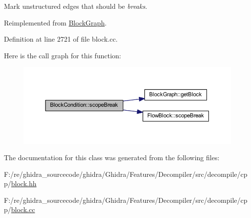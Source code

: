Mark unstructured edges that should be {\itshape breaks}. 



Reimplemented from \mbox{\hyperlink{class_block_graph_a55618dfd49266bd4185d119f08e8b630}{Block\+Graph}}.



Definition at line 2721 of file block.\+cc.

Here is the call graph for this function\+:
\nopagebreak
\begin{figure}[H]
\begin{center}
\leavevmode
\includegraphics[width=350pt]{class_block_condition_ab25a80cf066d355146cd5b4a67d91f46_cgraph}
\end{center}
\end{figure}


The documentation for this class was generated from the following files\+:\begin{DoxyCompactItemize}
\item 
F\+:/re/ghidra\+\_\+sourcecode/ghidra/\+Ghidra/\+Features/\+Decompiler/src/decompile/cpp/\mbox{\hyperlink{block_8hh}{block.\+hh}}\item 
F\+:/re/ghidra\+\_\+sourcecode/ghidra/\+Ghidra/\+Features/\+Decompiler/src/decompile/cpp/\mbox{\hyperlink{block_8cc}{block.\+cc}}\end{DoxyCompactItemize}
